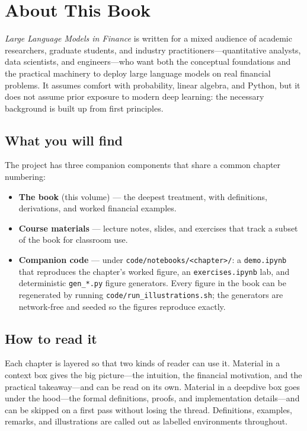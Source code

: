 \chapter*{About This Book}

\emph{Large Language Models in Finance} is written for a mixed audience of academic
researchers, graduate students, and industry practitioners---quantitative analysts, data
scientists, and engineers---who want both the conceptual foundations and the practical
machinery to deploy large language models on real financial problems. It assumes comfort
with probability, linear algebra, and Python, but it does not assume prior exposure to
modern deep learning: the necessary background is built up from first principles.

\section*{What you will find}

The project has three companion components that share a common chapter numbering:

\begin{itemize}
  \item \textbf{The book} (this volume) --- the deepest treatment, with definitions,
        derivations, and worked financial examples.
  \item \textbf{Course materials} --- lecture notes, slides, and exercises that track a
        subset of the book for classroom use.
  \item \textbf{Companion code} --- under \texttt{code/notebooks/<chapter>/}: a
        \texttt{demo.ipynb} that reproduces the chapter's worked figure, an
        \texttt{exercises.ipynb} lab, and deterministic \texttt{gen\_*.py} figure
        generators. Every figure in the book can be regenerated by running
        \texttt{code/run\_illustrations.sh}; the generators are network-free and seeded so
        the figures reproduce exactly.
\end{itemize}

\section*{How to read it}

Each chapter is layered so that two kinds of reader can use it. Material in a
\textsf{context} box gives the big picture---the intuition, the financial motivation, and
the practical takeaway---and can be read on its own. Material in a \textsf{deepdive} box
goes under the hood---the formal definitions, proofs, and implementation details---and can
be skipped on a first pass without losing the thread. Definitions, examples, remarks, and
illustrations are called out as labelled environments throughout.

